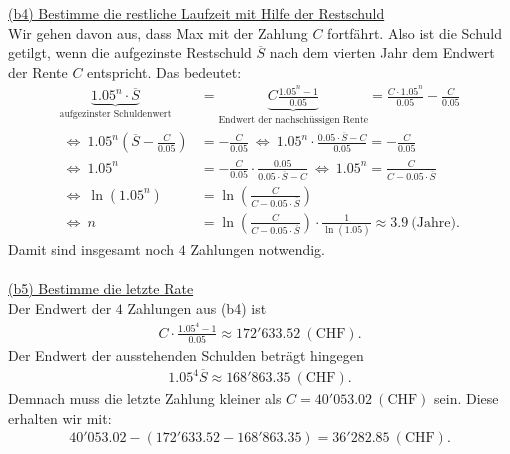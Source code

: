 \underline{(b4) Bestimme die restliche Laufzeit mit Hilfe der Restschuld}\\
Wir gehen davon aus, dass Max mit der Zahlung $ C $ fortfährt.
Also ist die Schuld getilgt, wenn die aufgezinste Restschuld $ \overline{S} $ nach dem vierten Jahr dem Endwert der Rente $ C $ entspricht. Das bedeutet:
\begin{align*}
	\underbrace{1.05^n \cdot \overline{S}}_{\textrm{aufgezinster Schuldenwert}}
	&=
	\underbrace{C\frac{1.05^n -1}{0.05}}_{\textrm{Endwert der nachschüssigen Rente}}
	=
	\frac{C \cdot 1.05^n}{0.05} - \frac{C}{0.05}\\
	\ \Leftrightarrow \
	1.05^n \left(\overline{S} - \frac{C}{0.05}\right) &= - \frac{C}{0.05}
	\ \Leftrightarrow \
	1.05^n \cdot \frac{0.05 \cdot \overline{S} -C}{0.05}  = -\frac{C}{0.05}\\
	\ \Leftrightarrow \
	1.05^n &= -\frac{C}{0.05} \cdot \frac{0.05}{0.05 \cdot \overline{S} -C}
	 \  \Leftrightarrow \
	1.05^n =  \frac{C}{C - 0.05 \cdot \overline{S}}\\
	\ \Leftrightarrow \
	\ln(1.05^n) &= \ln\left(\frac{C}{C - 0.05 \cdot \overline{S}}\right)\\
	\ \Leftrightarrow \
	n &= \ln\left(\frac{C}{C - 0.05 \cdot \overline{S}}\right)\cdot \frac{1}{\ln(1.05)}
	\approx 3.9 \ \textrm{(Jahre)}.
\end{align*}
Damit sind insgesamt noch $ 4 $ Zahlungen notwendig.\\
\\
\underline{(b5) Bestimme die letzte Rate}\\
Der Endwert der $ 4 $ Zahlungen aus (b4) ist
\begin{align*}
	C \cdot \frac{1.05^4 -1 }{0.05}
	\approx 172'633.52 \ \mathrm{(CHF)}.
\end{align*}
Der Endwert der ausstehenden Schulden beträgt hingegen
\begin{align*}
	1.05^4 \overline{S}
	\approx 
	168'863.35 \ \mathrm{(CHF)}.
\end{align*}
Demnach muss die letzte Zahlung kleiner als $ C = 40'053.02 \ \mathrm{(CHF)} $ sein.
Diese erhalten wir mit:
\begin{align*}
	40'053.02 - (172'633.52 - 168'863.35)
	=36'282.85 \ \mathrm{(CHF)}.
\end{align*}

\newpage
